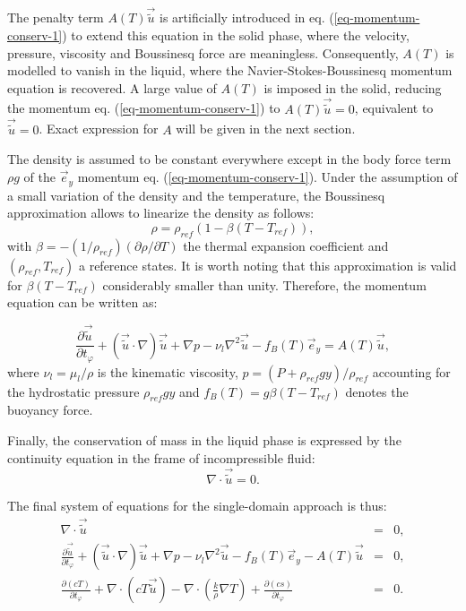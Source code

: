 The penalty term $A(T) \vec{\tilde{u}}$ is artificially introduced in eq. (\ref{eq-momentum-conserv-1}) to extend this equation in the solid phase, where the velocity, pressure, viscosity and Boussinesq force are meaningless.  Consequently, $A(T)$  is modelled to vanish in the liquid, where the Navier-Stokes-Boussinesq momentum equation is recovered. A large value of $A(T)$ is imposed in the solid, reducing the momentum eq. (\ref{eq-momentum-conserv-1})  to $A(T) \vec{\tilde{u}}=0$, equivalent to $\vec{\tilde{u}}=0$. Exact expression for $A$ will be given in the next section.

The density is assumed to be constant everywhere except in the body force term $\rho g$ of the $\vec e_y$ momentum eq. (\ref{eq-momentum-conserv-1}).
Under the assumption of a small variation of the density and the temperature, the Boussinesq approximation allows to linearize the density as follows:
\begin{equation}
   \rho = \rho_{ref} (1 - \beta (T-T_{ref})),
\end{equation}
with $\beta = - (1/\rho_{ref}) (\partial \rho / \partial T)$ the thermal expansion coefficient and $(\rho_{ref},T_{ref})$ a reference states.
It is worth noting that this approximation is valid for $\beta (T - T_{ref})$ considerably smaller than unity.
Therefore, the momentum equation can be written as:

\begin{equation}\label{eq-momentum-conserv}
  \frac{\partial \vec{\tilde{u}}}{\partial t_{\varphi}} +   {(\vec{\tilde{u}}\cdot\nabla ) \vec{\tilde{u}}} + \nabla p - \nu_{l}  {\nabla^2 \vec{\tilde{u}}} 
- f_B(T) \vec{e}_y= A(T) \vec{\tilde{u}},
\end{equation}
where  $\nu_l = \mu_l/\rho$ is the kinematic viscosity,  $p = (P + \rho_{ref} g y)/ \rho_{ref}$ accounting for the hydrostatic pressure $\rho_{ref} g y$ and $f_B(T) = g \beta (T-T_{ref})$ denotes the buoyancy force.

Finally, the conservation of mass in the liquid phase is expressed by the continuity equation in the frame of incompressible fluid:
\begin{equation}\label{eq-mass-conserv}
\nabla \cdot \vec{\tilde{u}} = 0.
\end{equation} 

The final system of equations for the single-domain approach is thus:
\begin{eqnarray}
	\nabla \cdot \vec{\tilde{u}} &=& 0, \\
	\frac{\partial \vec{\tilde{u}}}{\partial t_{\varphi}} +   {(\vec{\tilde{u}}\cdot\nabla ) \vec{\tilde{u}}} + \nabla p - \nu_{l}  {\nabla^2 \vec{\tilde{u}}} 
- f_B(T) \vec{e}_y - A(T) \vec{\tilde{u}} & = & 0, \\
	\frac{\partial \left(c T\right)}{\partial t_{\varphi}} + \nabla \cdot\left( c T \vec{\tilde{u}}\right) -
\nabla \cdot\left( \frac{k}{\rho} \nabla T \right) +  \frac{\partial \left(c s\right)}{\partial t_{\varphi}}  &=& 0.
\end{eqnarray}


